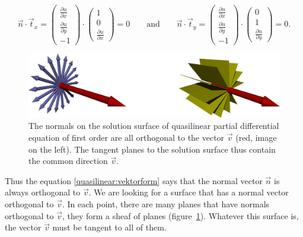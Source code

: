 \[
\vec n\cdot\vec t_x
=
\begin{pmatrix}
\frac{\partial u}{\partial x}\\
\frac{\partial u}{\partial y}\\
-1
\end{pmatrix}
\cdot
\begin{pmatrix}1\\0\\\frac{\partial u}{\partial x}\end{pmatrix}
=0
\qquad
\text{and}
\qquad
\vec n\cdot\vec t_y
=
\begin{pmatrix}
\frac{\partial u}{\partial x}\\
\frac{\partial u}{\partial y}\\
-1
\end{pmatrix}
\cdot
\begin{pmatrix}0\\1\\\frac{\partial u}{\partial y}\end{pmatrix}
=0.
\]
\begin{figure}
\begin{center}
\includegraphics[width=\hsize]{../common/3d/normals.jpg}
\end{center}
\caption{
The normals on the solution surface of quasilinear partial differential
equation of first order are all orthogonal to the vector $\vec{v}$
(red, image on the left).
The tangent planes to the solution surface thus contain the common
direction $\vec{v}$.
\label{geometrie:normals}}
\end{figure}%
Thus the equation \eqref{quasilinear:vektorform} says that the normal
vector $\vec{n}$ is always orthogonal to $\vec{v}$.
We are looking for a surface that has a normal vector orthogonal to
$\vec{v}$.
In each point, there are many planes that have normals orthogonal
to $\vec{v}$, they form a sheaf of planes
(figure~\ref{geometrie:normals}).
Whatever this surface is, the vector $\vec{v}$ must be tangent to
all of them.

